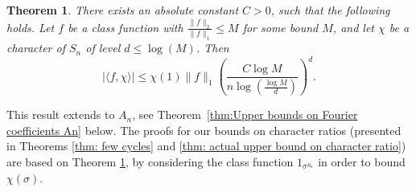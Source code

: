 \documentclass[11pt, letterpaper]{amsart}
\newtheorem{thm}{Theorem}[section]
\renewcommand\le{\leqslant}
\begin{document}
\begin{thm}\label{thm:Upper bounds on Fourier coefficients}
There exists an absolute constant $C>0$, such that the following holds. Let $f$ be a class function with $\frac{\|f\|_2}{\|f\|_1} \le M$ for some bound $M$, and let $\chi$ be a character of $S_n$ of level $d \le  \log(M) $. 
Then 
\[
|\langle f , \chi \rangle| \le  \chi(1)\|f\|_1\left(\frac{C\log M}{n \log \left(\frac{\log M}{d}\right)} \right)^d. 
\]
\end{thm}
This result extends to $A_n$, see Theorem~\ref{thm:Upper bounds on Fourier coefficients An} below.
The proofs for our bounds on character ratios (presented in Theorems \ref{thm: few cycles} and \ref{thm: actual upper bound on character ratio}) are based on Theorem \ref{thm:Upper bounds on Fourier coefficients}, by considering the class function $1_{\sigma^{S_n}}$ in order to bound $\chi(\sigma)$.
\end{document}
